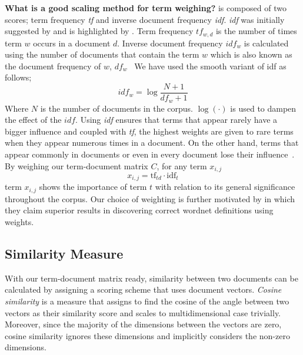 \textbf{What is a good scaling method for term weighing?}
\tfidf{} is composed of two scores; term frequency \emph{tf} and inverse document frequency \emph{idf}.
\emph{idf} was initially suggested by \textcite{jones_statistical_1972} and is highlighted by \textcite{manning_introduction_2009}.
Term frequency $tf_{w,d}$ is the number of times term $w$ occurs in a document $d$.
Inverse document frequency $idf_{w}$ is calculated using the number of documents that contain the term $w$ which is also known as the document frequency of $w$, $df_w$~\cite{manning_introduction_2009}
We have used the smooth variant of idf as follows;
\begin{equation}
    idf_w = \log{\frac{N + 1}{df_w + 1}}
\end{equation}
Where $N$ is the number of documents in the corpus. $\log(\cdot)$ is used to dampen the effect of the $idf$.
Using \emph{idf} ensures that terms that appear rarely have a bigger influence and coupled with \emph{tf}, the highest weights are given to rare terms when they appear numerous times in a document.
On the other hand, terms that appear commonly in documents or even in every document lose their influence~\cite{manning_introduction_2009}.
By weighing our term-document matrix $C$, for any term $x_{i,j}$
\begin{equation}
x_{i,j} = \text{tf}_{td} \cdot \text{idf}_{t} \end{equation}
term $x_{i,j}$ shows the importance of term $t$ with relation to its general significance throughout the corpus.
Our choice of \tfidf{} weighting is further motivated by \textcite{ruiz-casado_automatic_2005} in which they claim superior results in discovering correct wordnet definitions using \tfidf{} weights.

\subsection{Similarity Measure}%
\label{sub:similarity_measure}

With our term-document matrix ready, similarity between two documents can be calculated by assigning a scoring scheme that uses document vectors.
\emph{Cosine similarity} is a measure that assigns to find the cosine of the angle between two vectors as their similarity score and scales to multidimensional case trivially.
Moreover, since the majority of the dimensions between the vectors are zero, cosine similarity ignores these dimensions and implicitly considers the non-zero dimensions.

